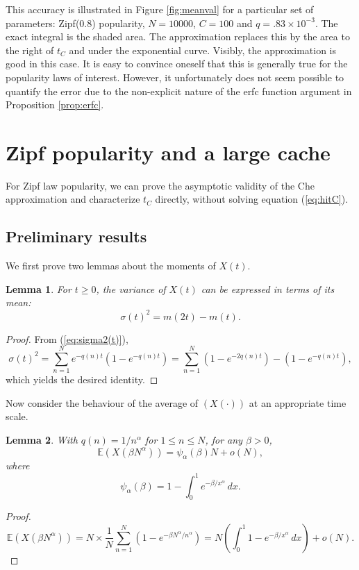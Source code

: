 \documentclass{amsart}
\newtheorem{lemma}{Lemma}
\def\E{{\mathbb E}}
\begin{document}
This accuracy is illustrated in Figure  \ref{fig:meanval} for a particular set of parameters: Zipf(0.8) popularity, $N=10000$, $C=100$ and $q=.83 \times 10^{-3}$. The exact integral is the shaded area. The approximation replaces this by the area to the right of $t_C$ and under the exponential curve. Visibly, the approximation is good in this case. It is easy to convince oneself that this is generally true for the popularity laws of interest. However, it unfortunately does not seem possible to quantify the error due to the non-explicit nature of the erfc function argument in Proposition \ref{prop:erfc}.


\section{Zipf popularity and a large cache}
\label{sec:largecache}

For Zipf law popularity, we can prove the asymptotic validity of the Che approximation and characterize $t_C$ directly, without solving equation (\ref{eq:hitC}). 

 
\subsection{Preliminary results}
We first prove two lemmas about the moments of $X(t)$.

\begin{lemma}\label{lem:estvar} For $t\geq 0$, the variance of $X(t)$ can be expressed in terms of its mean:
\[
\sigma(t)^2=m(2t) - m(t).
\]
\end{lemma}

\begin{proof}
From (\ref{eq:sigma2(t)}),
\[
\sigma(t)^2= \sum_{n=1}^{N} e^{-q(n) t}\left(1-e^{-q(n) t}\right)
= \sum_{n=1}^{N} \left(1- e^{-2q(n) t}\right) - \left(1-e^{-q(n) t}\right),
\]
which yields the desired identity. 
\end{proof}

 
Now consider the behaviour of the average of $(X(\cdot))$ at an appropriate time scale.

\begin{lemma}\label{lem:AsympE} 
With $q(n)=1/n^{\alpha}$ for $1\le n \le N$, for any $\beta>0$, 
\[
\E(X(\beta N^\alpha ))= \psi_\alpha(\beta)N+o(N),
\]
where 
\[
\psi_\alpha(\beta)= 1-\int_0^1 e^{-\beta/x^\alpha}\,dx.
\]
\end{lemma}

\begin{proof}

\[
\E(X(\beta N^\alpha ))= N\times \frac{1}{N}\sum_{n=1}^N \left(1-e^{-\beta N^\alpha/n^\alpha}\right)=
N\left(\int_0^1 1-e^{-\beta/x^\alpha}\,dx\right) +o(N).
\]

\end{proof}
\end{document}
